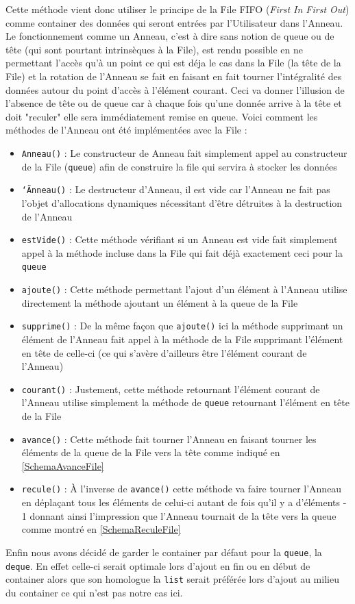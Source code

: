 \documentclass{article}
\newcommand{\info}{\texttt}
\begin{document}
        Cette méthode vient donc utiliser le principe de la File FIFO (\emph{First In First Out}) comme container des données qui seront entrées par l'Utilisateur dans l'Anneau. Le fonctionnement comme un Anneau, c'est à dire sans notion de queue ou de tête (qui sont pourtant intrinsèques à la File), est rendu possible en ne permettant l'accès qu'à un point ce qui est déja le cas dans la File (la tête de la File) et la rotation de l'Anneau se fait en faisant en fait tourner l'intégralité des données autour du point d'accès à l'élément courant. Ceci va donner l'illusion de l'absence de tête ou de queue car à chaque fois qu'une donnée arrive à la tête et doit "reculer" elle sera immédiatement remise en queue.
        Voici comment les méthodes de l'Anneau ont été implémentées avec la File :
        \label{TabMethodesFile}
        \begin{itemize}
            \item \info{Anneau()} : Le constructeur de Anneau fait simplement appel au constructeur de la File (\info{queue}) afin de construire la file qui servira à stocker les données
            \item \info{\info{\char`\~Anneau()}} : Le destructeur d'Anneau, il est vide car l'Anneau ne fait pas l'objet d'allocations dynamiques nécessitant d'être détruites à la destruction de l'Anneau
            \item \info{estVide()} : Cette méthode vérifiant si un Anneau est vide fait simplement appel à la méthode incluse dans la File qui fait déjà exactement ceci pour la \info{queue}
            \item \info{ajoute()} : Cette méthode permettant l'ajout d'un élément à l'Anneau utilise directement la méthode ajoutant un élément à la queue de la File
            \item \info{supprime()} : De la même façon que \info{ajoute()} ici la méthode supprimant un élément de l'Anneau fait appel à la méthode de la File supprimant l'élément en tête de celle-ci (ce qui s'avère d'ailleurs être l'élément courant de l'Anneau)
            \item \info{courant()} : Justement, cette méthode retournant l'élément courant de l'Anneau utilise simplement la méthode de \info{queue} retournant l'élément en tête de la File
            \item \info{avance()} : Cette méthode fait tourner l'Anneau en faisant tourner les éléments de la queue de la File vers la tête comme indiqué en \ref{SchemaAvanceFile}
            \item \info{recule()} : \`A l'inverse de \info{avance()} cette méthode va faire tourner l'Anneau en déplaçant tous les éléments de celui-ci autant de fois qu'il y a d'éléments - 1 donnant ainsi l'impression que l'Anneau tournait de la tête vers la queue comme montré en \ref{SchemaReculeFile}
        \end{itemize}
        Enfin nous avons décidé de garder le container par défaut pour la \info{queue}, la \info{deque}. En effet celle-ci serait optimale lors d'ajout en fin ou en début de container alors que son homologue la \info{list} serait préférée lors d'ajout au milieu du container ce qui n'est pas notre cas ici.
        
\end{document}
